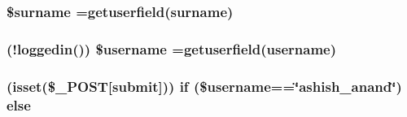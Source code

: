 \subsubsection[{\texorpdfstring{\$surname}{$surname}}]{\setlength{\rightskip}{0pt plus 5cm}\$surname =getuserfield(\textquotesingle{}surname\textquotesingle{})}\hypertarget{main_8php_a5c7ca58dd36213d80d84035699c3ed73}{}\label{main_8php_a5c7ca58dd36213d80d84035699c3ed73}
\subsubsection[{\texorpdfstring{\$username}{$username}}]{ (!{\bf loggedin}()) \$username =getuserfield(\textquotesingle{}username\textquotesingle{})}\hypertarget{main_8php_acc098a0710d41b208e95c39f094a3e4c}{}\label{main_8php_acc098a0710d41b208e95c39f094a3e4c}
\subsubsection[{\texorpdfstring{else}{else}}]{ (isset(\$\+\_\+\+P\+O\+ST\mbox{[}\textquotesingle{}submit\textquotesingle{}\mbox{]})) {\bf if} (\$username==\char`\"{}ashish\+\_\+anand\char`\"{}) else}\hypertarget{main_8php_afda65626e1ddf4f77d7b41e578b697de}{}\label{main_8php_afda65626e1ddf4f77d7b41e578b697de}
